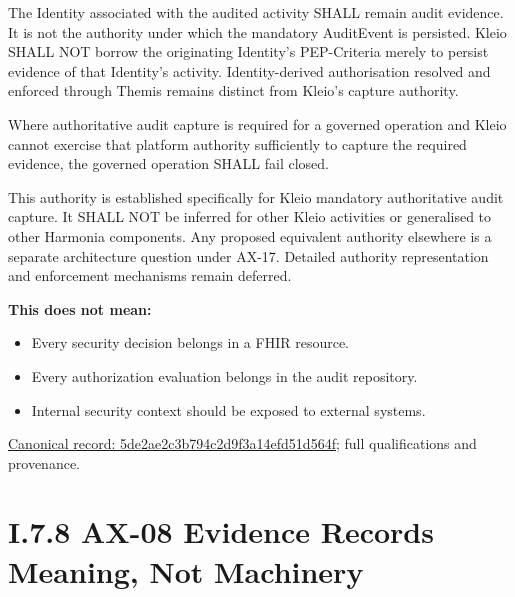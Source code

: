 The Identity associated with the audited activity SHALL remain audit evidence.
It is not the authority under which the mandatory AuditEvent is persisted.
Kleio SHALL NOT borrow the originating Identity's PEP-Criteria merely to persist
evidence of that Identity's activity. Identity-derived authorisation resolved
and enforced through Themis remains distinct from Kleio's capture authority.



Where authoritative audit capture is required for a governed operation and
Kleio cannot exercise that platform authority sufficiently to capture the
required evidence, the governed operation SHALL fail closed.



This authority is established specifically for Kleio mandatory authoritative
audit capture. It SHALL NOT be inferred for other Kleio activities or generalised
to other Harmonia components. Any proposed equivalent authority elsewhere is
a separate architecture question under AX-17. Detailed authority representation
and enforcement mechanisms remain deferred.



\textbf{This does not mean:}



\begin{itemize}


\item Every security decision belongs in a FHIR resource.

\item Every authorization evaluation belongs in the audit repository.

\item Internal security context should be exposed to external systems.

\end{itemize}

{\footnotesize \href{../../../../../../../../continuum/motivation/principle/architectural-axiom/5de2ae2c3b794c2d9f3a14efd51d564f.md}{Canonical record: 5de2ae2c3b794c2d9f3a14efd51d564f}; full qualifications and provenance.}\par
\section*{I.7.8 AX-08 Evidence Records Meaning, Not Machinery}
\label{navigation:I.7.8}

